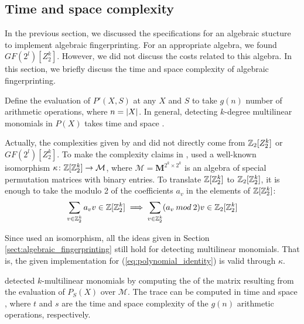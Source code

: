 \subsection{Time and space complexity}
\label{sect:complexity}

In the previous section, we discussed the specifications 
for an algebraic stucture to implement algebraic fingerprinting. 
For an appropriate algebra, we found $GF(2^{l})[Z_2^k]$. 
However, we did not discuss the costs related 
to this algebra. In this section, we briefly discuss the time and space complexity 
of algebraic fingerprinting.

Define the evaluation of $P'(X, S)$ at any $X$ and $S$ to take $g(n)$ number of  
arithmetic operations, where $n = {\left\vert X\right\vert}$. In general, 
detecting $k$-degree multilinear monomials in $P(X)$ takes 
 time and  space \cite{Williams09}.

Actually, the complexities given by \citeauthor{Koutis08} \cite{Koutis08} and 
\citeauthor{Williams09} \cite{Williams09} did not directly come from 
$\mathbb Z_2[Z_2^k]$ or $GF(2^{l})[Z_2^k]$. 
To make the complexity claims in \cite{Koutis08}, 
\citeauthor{Koutis08} used a well-known \cite{Terras99} isomorphism 
$\kappa \colon \mathbb Z[\mathbb Z_2^k] \to \mathcal{M}$, where $\mathcal{M} = \mathbf{M}^{2^k \times 2^k}$ 
is an algebra of special permutation matrices with binary entries. To translate $\mathbb Z[\mathbb Z_2^k]$ to 
$\mathbb Z_2[\mathbb Z_2^k]$, it is enough to take the modulo 2 of the coefficients $a_v$ in 
the elements of $\mathbb Z[\mathbb Z_2^k]$: 
\[
  \displaystyle \sum_{v \in \mathbb Z_2^k}a_v v \in \mathbb Z[\mathbb Z_2^k] \implies 
  \displaystyle \sum_{v \in \mathbb Z_2^k}(a_v \: mod \: 2) v \in \mathbb Z_2[\mathbb Z_2^k]
\]

Since \citeauthor{Koutis08} 
used an isomorphism, all the ideas given in 
Section \ref{sect:algebraic_fingerprinting} still hold for 
detecting multilinear monomials. That is, 
the given implementation for (\ref{eq:polynomial_identity}) is valid through $\kappa$.

\citeauthor{Koutis08} \cite{Koutis08} detected $k$-multilinear monomials 
by computing the  of the matrix resulting 
from the evaluation of $P_S(X)$ over $\mathcal{M}$. The trace can be computed 
in time  and space , where $t$ and $s$ are the time 
and space complexity of the $g(n)$ arithmetic operations, respectively. 

